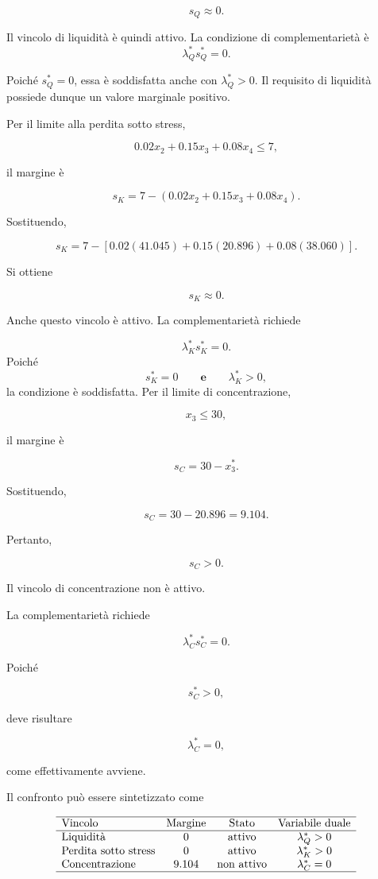 \begin{enumerate}
\[
s_Q
\approx
0.
\]

Il vincolo di liquidit\`a \`e quindi attivo. La condizione di complementariet\`a \`e
\[
\lambda_Q^*s_Q^*
=
0.
\]

Poich\'e $s_Q^*=0$, essa \`e soddisfatta anche con $\lambda_Q^*>0$.
Il requisito di liquidit\`a possiede dunque un valore marginale positivo.

Per il limite alla perdita sotto stress,

\[
0.02x_2+0.15x_3+0.08x_4
\leq
7,
\]

il margine \`e

\[
s_K
=
7-
\left(
0.02x_2+0.15x_3+0.08x_4
\right).
\]

Sostituendo,

\[
s_K
=
7
-
\left[
0.02(41.045)
+
0.15(20.896)
+
0.08(38.060)
\right].
\]

Si ottiene

\[
s_K
\approx
0.
\]

Anche questo vincolo \`e attivo. La complementariet\`a richiede

\[
\lambda_K^*s_K^*
=
0.
\]
Poich\'e
\[
s_K^*=0 \qquad \textbf{e} \qquad \lambda_K^*>0,
\]
la condizione \`e soddisfatta. Per il limite di concentrazione,

\[
x_3\leq30,
\]

il margine \`e

\[
s_C
=
30-x_3^*.
\]

Sostituendo,

\[
s_C
=
30-20.896
=
9.104.
\]

Pertanto,

\[
s_C>0.
\]

Il vincolo di concentrazione non \`e attivo.

La complementariet\`a richiede

\[
\lambda_C^*s_C^*
=
0.
\]

Poich\'e

\[
s_C^*>0,
\]

deve risultare

\[
\lambda_C^*=0,
\]

come effettivamente avviene.

Il confronto pu\`o essere sintetizzato come

\[
\begin{array}{lccc}
\hline
\text{Vincolo}
&
\text{Margine}
&
\text{Stato}
&
\text{Variabile duale}
\\
\hline
\text{Liquidit\`a}
&
0
&
\text{attivo}
&
\lambda_Q^*>0
\\
\text{Perdita sotto stress}
&
0
&
\text{attivo}
&
\lambda_K^*>0
\\
\text{Concentrazione}
&
9.104
&
\text{non attivo}
&
\lambda_C^*=0
\\
\hline
\end{array}
\]


\end{enumerate}
